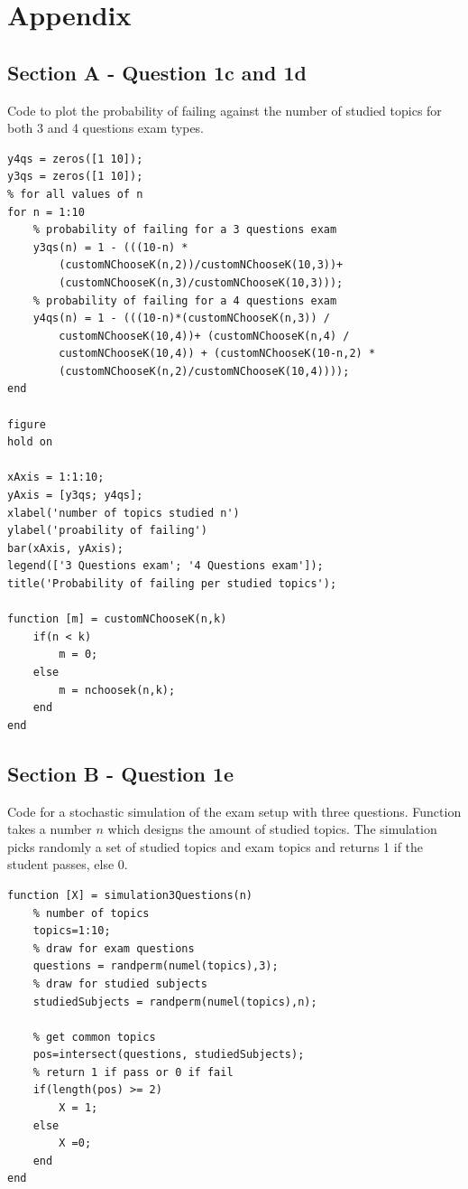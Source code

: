 \documentclass[10pt]{article}
\begin{document}
\section*{Appendix}
\subsection*{Section A - Question 1c and 1d}
Code to plot the probability of failing against the number of 
studied topics for both 3 and 4 questions exam types. \\
\begin{lstlisting}
y4qs = zeros([1 10]);
y3qs = zeros([1 10]);
% for all values of n
for n = 1:10
    % probability of failing for a 3 questions exam
    y3qs(n) = 1 - (((10-n) *
        (customNChooseK(n,2))/customNChooseK(10,3))+
        (customNChooseK(n,3)/customNChooseK(10,3)));
    % probability of failing for a 4 questions exam
    y4qs(n) = 1 - (((10-n)*(customNChooseK(n,3)) /
        customNChooseK(10,4))+ (customNChooseK(n,4) /
        customNChooseK(10,4)) + (customNChooseK(10-n,2) *
        (customNChooseK(n,2)/customNChooseK(10,4))));
end

figure
hold on

xAxis = 1:1:10;
yAxis = [y3qs; y4qs];
xlabel('number of topics studied n')
ylabel('proability of failing')
bar(xAxis, yAxis);
legend(['3 Questions exam'; '4 Questions exam']);
title('Probability of failing per studied topics');

function [m] = customNChooseK(n,k)
    if(n < k)
        m = 0;
    else
        m = nchoosek(n,k); 
    end
end
\end{lstlisting}


\subsection*{Section B - Question 1e}
Code for a stochastic simulation of the exam setup with three questions.
Function takes a number $ n $ which designs the amount of studied topics.
The simulation picks randomly a set of studied topics and exam topics 
and returns 1 if the student passes, else 0.
\begin{lstlisting}
function [X] = simulation3Questions(n)
    % number of topics
    topics=1:10;
    % draw for exam questions
    questions = randperm(numel(topics),3);
    % draw for studied subjects
    studiedSubjects = randperm(numel(topics),n); 
    
    % get common topics
    pos=intersect(questions, studiedSubjects);
    % return 1 if pass or 0 if fail
    if(length(pos) >= 2)
        X = 1; 
    else 
        X =0;
    end
end    
\end{lstlisting}
\end{document}
